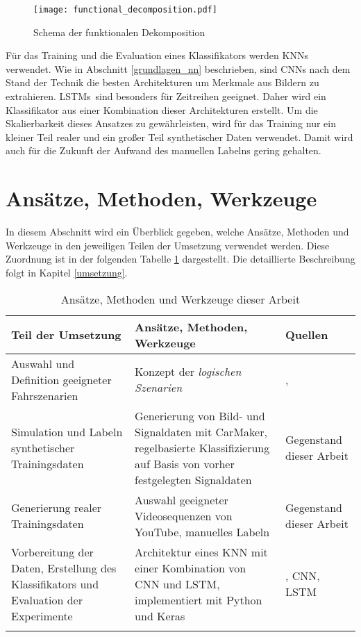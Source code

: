 \begin{figure}[h]
\centering
\texttt{[image: functional\_decomposition.pdf]}
\caption{Schema der funktionalen Dekomposition \cite{amersbach2017functional}}
\label{fig_functional_decomposition}
\end{figure}

Für das Training und die Evaluation eines Klassifikators werden \acp{KNN} verwendet. Wie in Abschnitt \ref{grundlagen_nn} beschrieben, sind \acp{CNN} nach dem Stand der Technik die besten Architekturen um Merkmale aus Bildern zu extrahieren. \acp{LSTM} sind besonders für Zeitreihen geeignet. Daher wird ein Klassifikator aus einer Kombination dieser Architekturen erstellt. Um die Skalierbarkeit dieses Ansatzes zu gewährleisten, wird für das Training nur ein kleiner Teil realer und ein großer Teil synthetischer Daten verwendet. Damit wird auch für die Zukunft der Aufwand des manuellen Labelns gering gehalten.


\section{Ansätze, Methoden, Werkzeuge}
\label{konzept_methodik}

In diesem Abschnitt wird ein Überblick gegeben, welche Ansätze, Methoden und Werkzeuge in den jeweiligen Teilen der Umsetzung verwendet werden. Diese Zuordnung ist in der folgenden Tabelle \ref{tab_konzept_methods} dargestellt. Die detaillierte Beschreibung folgt in Kapitel \ref{umsetzung}.

\small
\begin{longtable}[c]{p{5cm} p{6.5cm} p{1.5cm}}
\textbf{Teil der Umsetzung} & \textbf{Ansätze, Methoden, Werkzeuge} & \textbf{Quellen} \\
\hline
\endhead

Auswahl und Definition geeigneter Fahrszenarien & Konzept der \textit{logischen Szenarien} & \cite{ulbrich2015defining}, \cite{bagschik2017szenarien} \\
\hline
Simulation und Labeln synthetischer Trainingsdaten & Generierung von Bild- und Signaldaten mit CarMaker, regelbasierte Klassifizierung auf Basis von vorher festgelegten Signaldaten & Gegenstand dieser Arbeit \\
\hline
Generierung realer Trainingsdaten & Auswahl geeigneter Videosequenzen von YouTube, manuelles Labeln & Gegenstand dieser Arbeit \\
\hline
Vorbereitung der Daten, Erstellung des Klassifikators und Evaluation der Experimente & Architektur eines \ac{KNN} mit einer Kombination von \ac{CNN} und \ac{LSTM}, implementiert mit Python und Keras & \cite{chollet2015keras}, CNN, LSTM \\

\hline
\caption{Ansätze, Methoden und Werkzeuge dieser Arbeit}
\label{tab_konzept_methods}
\end{longtable}
\normalsize




